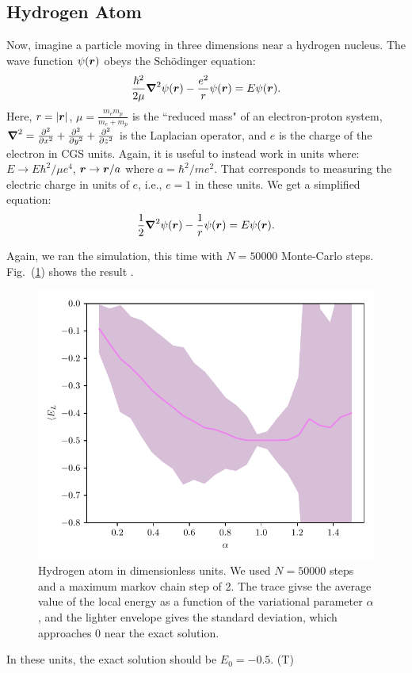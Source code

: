 \documentclass[12pt]{article}
\numberwithin{equation}{section}
\begin{document}
\subsection{Hydrogen Atom}
Now, imagine a particle moving in three dimensions near a hydrogen nucleus.  The wave function $\psi(\vb* r)$ obeys the Sch\"odinger equation:
\begin{equation}
    \frac{\hbar^2}{2\mu}\grad^2\psi(\vb*r) - \frac{e^2}{r}\psi(\vb*r) = E \psi(\vb*r).
\end{equation}
Here, $r = |\vb* r|$, $\mu = \frac{m_e m_p}{m_e + m_p}$ is the ``reduced mass" of an electron-proton system, $\grad^2 = \pdv[2]{x} + \pdv[2]{y} + \pdv[2]{z}$ is the Laplacian operator, and $e$ is the charge of the electron in CGS units.  Again, it is useful to instead work in units where: $E \rightarrow E \hbar^2 /\mu e^4$, $\vb*r \rightarrow \vb*r / a$ where $a = \hbar^2 / me^2$.  That corresponds to measuring the electric charge in units of $e$, i.e., $e=1$ in these units.  We get a simplified equation:
\begin{equation}
    \frac12\grad^2\psi(\vb*r) - \frac{1}{r}\psi(\vb*r) = E \psi(\vb*r).
\end{equation}

Again, we ran the simulation, this time with $N=50 000$ Monte-Carlo steps.  Fig.~(\ref{fig:hydrogen_atom}) shows the result .
\begin{figure}[ht]
    \centering
    \includegraphics{../scripts/hydrogen_atom.pdf}
    \caption{Hydrogen atom in dimensionless units.  We used $N = 50 000$ steps and a maximum markov chain step of 2.  The trace givse the average value of the local energy as a function of the variational parameter $\alpha$, and the lighter envelope gives the standard deviation, which approaches 0 near the exact solution.}
    \label{fig:hydrogen_atom}
\end{figure}
In these units, the exact solution should be $E_0 = -0.5$. (T)
\end{document}

